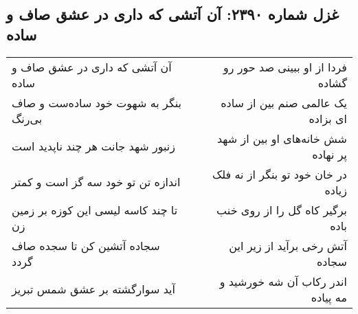 \begin{center}
\section*{غزل شماره ۲۳۹۰: آن آتشی که داری در عشق صاف و ساده}
\label{sec:2390}
\begin{longtable}{l p{0.5cm} r}
آن آتشی که داری در عشق صاف و ساده
&&
فردا از او ببینی صد حور رو گشاده
\\
بنگر به شهوت خود ساده‌ست و صاف بی‌رنگ
&&
یک عالمی صنم بین از ساده ای بزاده
\\
زنبور شهد جانت هر چند ناپدید است
&&
شش خانه‌های او بین از شهد پر نهاده
\\
اندازه تن تو خود سه گز است و کمتر
&&
در خان خود تو بنگر از نه فلک زیاده
\\
تا چند کاسه لیسی این کوزه بر زمین زن
&&
برگیر کاه گل را از روی خنب باده
\\
سجاده آتشین کن تا سجده صاف گردد
&&
آتش رخی برآید از زیر این سجاده
\\
آید سوارگشته بر عشق شمس تبریز
&&
اندر رکاب آن شه خورشید و مه پیاده
\\
\end{longtable}
\end{center}
